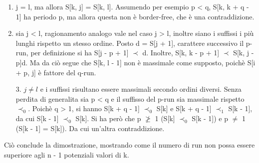 \documentclass{beamer}
\begin{document}
    \begin{frame}
        \begin{enumerate}
            \item j = l, ma allora S[k, j] = S[k, l].
                Assumendo per esempio p < q, S[k, k + q - 1] ha periodo p,
                ma allora questa non è border-free, che è una contraddizione.

            \item sia j < l, ragionamento analogo vale nel caso j > l, 
                inoltre siano i suffissi i più lunghi rispetto un stesso ordine.
                Posto d = S[j + 1], carattere successivo il p-run, 
                per definizione si ha S[j - p + 1] \(\prec\) d. 
                Inoltre, S[k, k - p + 1] \(\prec\) S[k, j - p]d. 
                Ma da ciò segue che S[k, l - 1] non è massimale come supposto,
                poichè S[i + p, j] è fattore del q-run.
        \end{enumerate}
    \end{frame}
    \begin{frame}
        \begin{enumerate}
            \item [3.] \(j \ne l\) e i suffissi risultano essere massimali secondo ordini diversi.
                Senza perdita di generalita sia p < q e il suffisso del p-run
                sia massimale rispetto \(\prec_{0}\).
                Poichè q > 1, si hanno S[k + q - 1] \(\prec_{0}\) S[k] e 
                S[k + q - 1] \(\prec_{1}\) S[k  - 1], da cui S[k - 1] \(\prec_{0}\) S[k].
                Si ha però che p \(\not\ge\) 1 (S[k] \(\prec_{0}\) S[k - 1]) 
                e p \(\ne\) 1 (S[k - 1] = S[k]). Da cui un'altra contraddizione.
        \end{enumerate}

        Ciò conclude la dimostrazione, 
        mostrando come il numero di run non possa essere superiore agli n - 1 
        potenziali valori di k.
    \end{frame}
\end{document}
